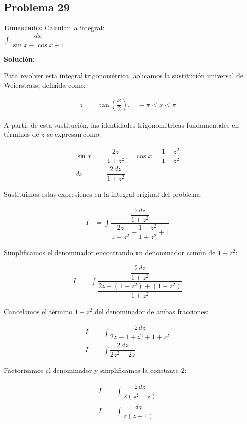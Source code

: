 \subsection*{Problema 29}

\textbf{Enunciado:} Calcular la integral:\\
$\int \dfrac{dx}{\sin x - \cos x + 1}$

\textbf{Solución:}

Para resolver esta integral trigonométrica, aplicamos la sustitución universal de Weierstrass, definida como:

\begin{align*}
z &= \tan\left(\dfrac{x}{2}\right), \quad -\pi < x < \pi
\end{align*}

A partir de esta sustitución, las identidades trigonométricas fundamentales en términos de $z$ se expresan como:

\begin{align*}
\sin x &= \dfrac{2z}{1 + z^2}, \quad \cos x = \dfrac{1 - z^2}{1 + z^2} \\
dx &= \dfrac{2 \, dz}{1 + z^2}
\end{align*}

Sustituimos estas expresiones en la integral original del problema:

\begin{align*}
I &= \int \dfrac{\dfrac{2 \, dz}{1 + z^2}}{\dfrac{2z}{1 + z^2} - \dfrac{1 - z^2}{1 + z^2} + 1}
\end{align*}

Simplificamos el denominador encontrando un denominador común de $1 + z^2$:

\begin{align*}
I &= \int \dfrac{\dfrac{2 \, dz}{1 + z^2}}{\dfrac{2z - (1 - z^2) + (1 + z^2)}{1 + z^2}}
\end{align*}

Cancelamos el término $1 + z^2$ del denominador de ambas fracciones:

\begin{align*}
I &= \int \dfrac{2 \, dz}{2z - 1 + z^2 + 1 + z^2} \\
I &= \int \dfrac{2 \, dz}{2z^2 + 2z}
\end{align*}

Factorizamos el denominador y simplificamos la constante $2$:

\begin{align*}
I &= \int \dfrac{2 \, dz}{2(z^2 + z)} \\
I &= \int \dfrac{dz}{z(z + 1)}
\end{align*}

